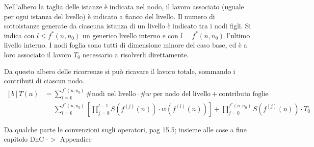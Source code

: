 Nell'albero la taglia delle istanze è indicata nel nodo, il lavoro associato (uguale per ogni istanza del livello) è indicato a fianco del livello. Il numero di sottoistanze generate da ciascuna istanza di un livello è indicato tra i nodi figli. Si indica con $l \leq f^*(n,n_0)$ un generico livello interno e con $\overline{l} = f^*(n,n_0)$ l'ultimo livello interno. I nodi foglia sono tutti di dimensione minore del caso base, ed è a loro associato il lavoro $T_0$ necessario a risolverli direttamente.

Da questo albero delle ricorrenze si può ricavare il lavoro totale, sommando i contributi di ciascun nodo.
\begin{equation}
    \begin{aligned}[b]
    T(n) & = \sum_{l=0}^{f^*(n,n_0)}\text{\# nodi nel livello}\cdot\text{\# $w$ per nodo del livello}+\text{contributo foglie}\\
    &= \sum_{l=0}^{f^*(n,n_0)} \left[ \prod_{j=0}^{l-1} S \left( f^{(j)}(n) \right) \cdot w \left( f^{(l)}(n) \right) \right] +
        \prod_{j=0}^{f^*(n,n_0)} S \left( f^{(j)}(n) \right) \cdot T_0
        \label{eq:formachiusaric}
    \end{aligned}
\end{equation}


Da qualche parte le convenzioni sugli operatori, pag 15.5; insieme alle cose a fine capitolo DnC -$>$ Appendice

